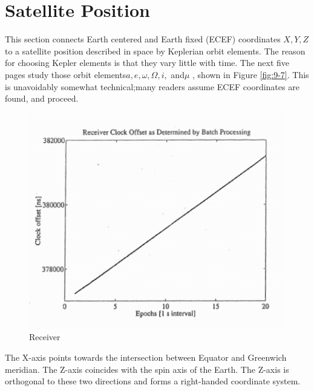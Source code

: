 \section{Satellite Position}
	This section connects Earth centered and Earth fixed (ECEF) coordinates $X,Y,Z$ to a satellite position described in space by Keplerian orbit elements. The reason for choosing Kepler elements is that they vary little with time. The next five pages study those orbit elements$a,e,\omega ,\Omega ,i,$ and$\mu$  , shown in Figure \ref{fig:9-7}. This is unavoidably somewhat technical;many readers assume ECEF coordinates are found, and proceed.
	\begin{figure}
		\centering
		\includegraphics[width=0.7\linewidth]{TeX_files/Part03/chapter09/image/9-6}
		\caption{Receiver}
		\label{fig:9-6}
	\end{figure}

	The X-axis points towards the intersection between Equator and Greenwich meridian. The Z-axis coincides with the spin axis of the Earth. The Z-axis is orthogonal to these two directions and forms a right-handed coordinate system.
	
